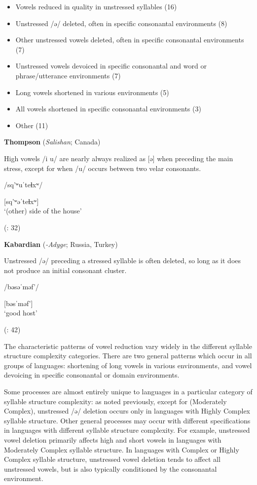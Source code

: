 \begin{itemize}
\item Vowels reduced in quality in unstressed syllables (16)
\item Unstressed /ə/ deleted, often in specific consonantal environments {(8)}
\item Other unstressed vowels deleted, often in specific consonantal environments (7)
\item Unstressed vowels devoiced in specific consonantal and word or phrase/utterance environments (7)
\item Long vowels shortened in various environments (5)
\item All vowels shortened in specific consonantal environments  {(3)}
\item Other (11)
\end{itemize}

\ea  \textbf{Thompson} (\textit{Salishan}; Canada)

High vowels /i u/ are nearly always realized as [ə] when preceding the main stress, except for when /u/ occurs between two velar consonants. 

/sq’ʷuˈteɬxʷ/

[sq’ʷəˈteɬxʷ]\\
\glt ‘(other) side of the house’

(\citealt{ThompsonThompson1992}: 32)

\ex  \textbf{Kabardian} (\textit{-Adyge}; Russia, Turkey) 

Unstressed /ə/ preceding a stressed syllable is often deleted, so long as it does not produce an initial consonant cluster.

/bəsəˈməf’/

[bəsˈməf’]\\
\glt ‘good host’

(\citealt{GordonApplebaum2010}: 42)
\z
\z

  The characteristic patterns of vowel reduction vary widely in the different syllable structure complexity categories. There are two general patterns which occur in all groups of languages: shortening of long vowels in various environments, and vowel devoicing in specific consonantal or domain environments. 

  Some processes are almost entirely unique to languages in a particular category of syllable structure complexity: as noted previously, except for  (Moderately Complex), unstressed /ə/ deletion occurs only in languages with Highly Complex syllable structure. Other general processes may occur with different specifications in languages with different syllable structure complexity. For example, unstressed vowel deletion primarily affects high and short vowels in languages with Moderately Complex syllable structure. In languages with Complex or Highly Complex syllable structure, unstressed vowel deletion tends to affect all unstressed vowels, but is also typically conditioned by the consonantal environment.

